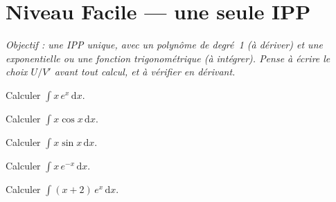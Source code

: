 \documentclass[11pt,a4paper]{article}
\newcommand{\dd}{\mathrm{d}}
\begin{document}
\section*{Niveau Facile — une seule IPP}

\emph{Objectif : une IPP unique, avec un polynôme de degré~1 (à dériver) et une exponentielle ou une
fonction trigonométrique (à intégrer). Pense à écrire le choix $U/V'$ avant tout calcul, et à vérifier en dérivant.}

\begin{exo}[1]
Calculer $\displaystyle \int x\,e^{x}\,\dd x$.
\end{exo}

\begin{exo}[2]
Calculer $\displaystyle \int x\cos x\,\dd x$.
\end{exo}

\begin{exo}[3]
Calculer $\displaystyle \int x\sin x\,\dd x$.
\end{exo}

\begin{exo}[4]
Calculer $\displaystyle \int x\,e^{-x}\,\dd x$.
\end{exo}

\begin{exo}[5]
Calculer $\displaystyle \int (x+2)\,e^{x}\,\dd x$.
\end{exo}
\end{document}
